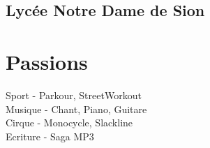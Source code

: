 \documentclass[]{cv-template}
\begin{document}
\begin{minipage}[t]{0.34\textwidth}
\subsection{Lycée Notre Dame de Sion}
\sectionsep



\section{Passions}
Sport - Parkour, StreetWorkout \\
Musique - Chant, Piano, Guitare\\
Cirque - Monocycle, Slackline\\
Ecriture - Saga MP3
\sectionsep





%
%
\end{minipage}
\end{document}
